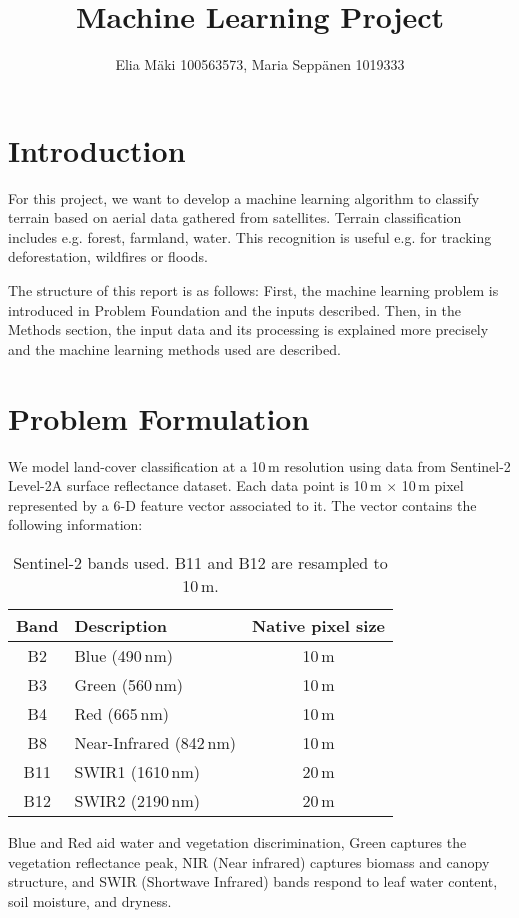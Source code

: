 \documentclass{article}
\title{Machine Learning Project}
\author{Elia Mäki 100563573, Maria Seppänen 1019333}
\begin{document}
\maketitle
\section{Introduction}
For this project, we want to develop a machine learning algorithm to classify terrain based on aerial data gathered from satellites. Terrain classification includes e.g. forest, farmland, water. This recognition is useful e.g. for tracking deforestation, wildfires or floods.

The structure of this report is as follows: First, the machine learning problem is introduced in Problem Foundation and the inputs described. Then, in the Methods section, the input data and its processing is explained more precisely and the machine learning methods used are described.  

\section{Problem Formulation}
We model land-cover classification at a 10\,m resolution using data from Sentinel-2 Level-2A surface reflectance dataset. Each data point is 10\,m $\times$ 10\,m pixel represented by a 6-D feature vector associated to it. The vector contains the following information:

\begin{table}[h]
    \centering
    \begin{tabular}{|c|l|c|}\hline
Band & Description & Native pixel size \\\hline
B2   & Blue (490\,nm) & 10\,m \\\hline
B3   & Green (560\,nm) & 10\,m \\\hline
B4   & Red (665\,nm) & 10\,m \\\hline
B8   & Near-Infrared (842\,nm) & 10\,m \\\hline
B11  & SWIR1 (1610\,nm) & 20\,m \\\hline
B12  & SWIR2 (2190\,nm) & 20\,m \\\hline
    \end{tabular}
    \caption{Sentinel-2 bands used. B11 and B12 are resampled to 10\,m.}
    \label{tab:s2bands}
\end{table}

Blue and Red aid water and vegetation discrimination, Green captures the vegetation reflectance peak,
NIR (Near infrared) captures biomass and canopy structure, and SWIR (Shortwave Infrared) bands respond to leaf water content, soil moisture, and dryness.
\end{document}
